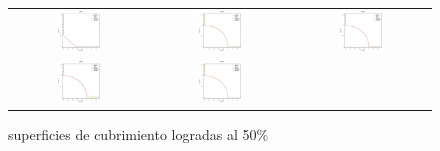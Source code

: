 \begin{figure}[h]
\caption{superficies de cubrimiento logradas al 50\%}%
\begin{tabular}{ccc}
  \includegraphics[width=0.33\textwidth]{Figures_Chapter7/Results_Chapter3/DTLZ1.eps} &
  \includegraphics[width=0.33\textwidth]{Figures_Chapter7/Results_Chapter3/DTLZ2.eps} &
  \includegraphics[width=0.33\textwidth]{Figures_Chapter7/Results_Chapter3/DTLZ3.eps} \\
  \includegraphics[width=0.33\textwidth]{Figures_Chapter7/Results_Chapter3/DTLZ4.eps} &
  \includegraphics[width=0.33\textwidth]{Figures_Chapter7/Results_Chapter3/DTLZ5.eps} &

\end{tabular}
\end{figure}
